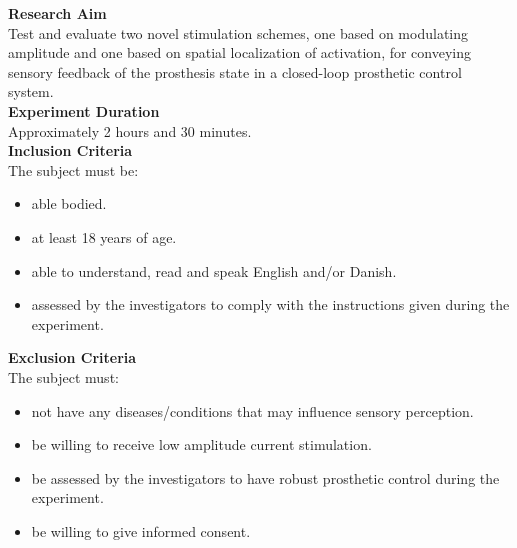 \noindent\textbf{Research Aim} \\
Test and evaluate two novel stimulation schemes, one based on modulating amplitude and one based on spatial localization of activation, for conveying sensory feedback of the prosthesis state in a closed-loop prosthetic control system.
\\

\noindent\textbf{Experiment Duration} \\
Approximately 2 hours and 30 minutes.
\\

\noindent\textbf{Inclusion Criteria} \\
The subject must be:
\vspace{-5pt}
\begin{itemize}
	\item able bodied. %
	\item at least 18 years of age.
	\item able to understand, read and speak English and/or Danish.
	\item assessed by the investigators to comply with the instructions given during the experiment.
\end{itemize}

\noindent\textbf{Exclusion Criteria} \\
The subject must:
\vspace{-5pt}
\begin{itemize}
	\item not have any diseases/conditions that may influence sensory perception.
	\item be willing to receive low amplitude current stimulation. 
	\item be assessed by the investigators to have robust prosthetic control during the experiment. 
	\item be willing to give informed consent. 
\end{itemize}

